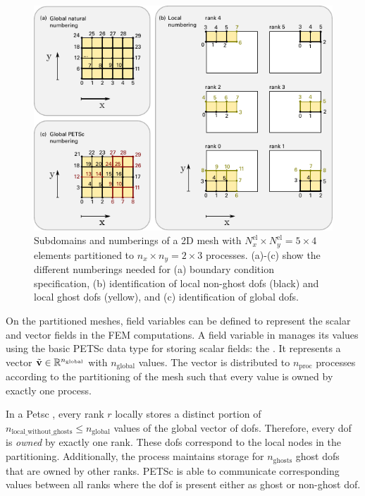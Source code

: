 \begin{figure}%
  \centering%
  \includegraphics[width=\textwidth]{images/implementation/dof_numbering.pdf}%
  \caption{Subdomains and numberings of a 2D mesh with $N^\text{el}_x \times N^\text{el}_y=5\times 4$ elements partitioned to $n_x\times n_y = 2 \times 3$ processes. (a)-(c) show the different numberings needed for (a) boundary condition specification, (b) identification of local non-ghost dofs (black) and local ghost dofs (yellow), and (c) identification of global dofs.}%
  \label{fig:dof_numbering}%
\end{figure}%

\renewcommand{\Vec}{\code{Vec}}

On the partitioned meshes, field variables can be defined to represent the scalar and vector fields in the FEM computations. A field variable in \opendihu{} manages its values using the basic PETSc data type for storing scalar fields: the \emph{\Vec{}}. It represents a vector $\tilde{\textbf{v}} \in \mathbb{R}^{n_\text{global}}$ with $n_\text{global}$ values. The vector is distributed to $n_\text{proc}$ processes according to the partitioning of the mesh such that every value is owned by exactly one process. 

In a Petsc \Vec{}, every rank $r$ locally stores a distinct portion of $n_\text{local\_without\_ghosts} \leq n_\text{global}$ values of the global vector of dofs. Therefore, every dof is \emph{owned} by exactly one rank. These dofs correspond to the local nodes in the partitioning.
Additionally, the process maintains storage for $n_\text{ghosts}$ ghost dofs that are owned by other ranks. 
PETSc is able to communicate corresponding values between all ranks where the dof is present either as ghost or non-ghost dof. 


